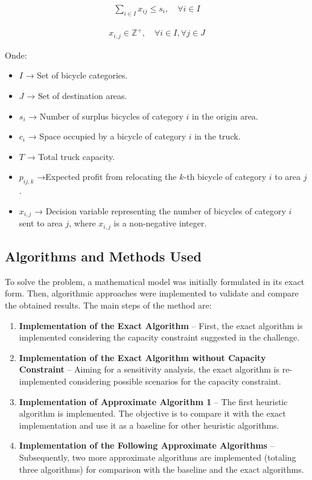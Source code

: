 \documentclass[]{article}
\begin{document}
\begin{align}
	\sum_{i \in I} x_{ij} \leq s_i, \quad \forall i \in I
\end{align}

\begin{align}
	x_{i,j} \in \mathbb{Z}^+,  \quad \forall i \in I, \forall j \in J
\end{align}

Onde:

\begin{itemize}
	\item $I$ → Set of bicycle categories.
	\item $J$ → Set of destination areas.
	\item $s_i$ → Number of surplus bicycles of category $i$ in the origin area.
	\item $c_i$ → Space occupied by a bicycle of category $i$ in the truck.
	\item $T$ → Total truck capacity.
	\item $p_{ij,k}$ →Expected profit from relocating the $k$-th bicycle of category $i$ to area $j$.
	\item $x_{i,j}$ → Decision variable representing the number of bicycles of category $i$ sent to area $j$, where $x_{i,j}$ is a non-negative integer.
\end{itemize}

\subsection{Algorithms and Methods Used}

To solve the problem, a mathematical model was initially formulated in its exact form. Then, algorithmic approaches were implemented to validate and compare the obtained results. The main steps of the method are:

\begin{enumerate}
	\item \textbf{Implementation of the Exact Algorithm} – First, the exact algorithm is implemented considering the capacity constraint suggested in the challenge.
	\item \textbf{Implementation of the Exact Algorithm without Capacity Constraint} – Aiming for a sensitivity analysis, the exact algorithm is re-implemented considering possible scenarios for the capacity constraint.
	\item \textbf{Implementation of Approximate Algorithm 1} – The first heuristic algorithm is implemented. The objective is to compare it with the exact implementation and use it as a baseline for other heuristic algorithms.
	\item \textbf{Implementation of the Following Approximate Algorithms} – Subsequently, two more approximate algorithms are implemented (totaling three algorithms) for comparison with the baseline and the exact algorithms.
\end{enumerate}
\end{document}
